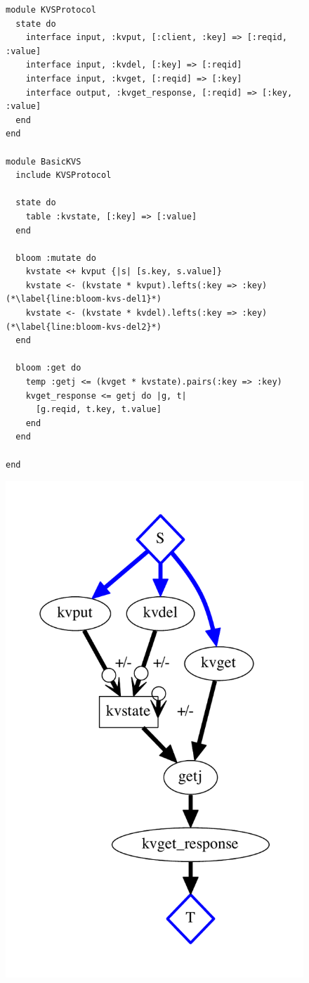 \begin{figure}[t]
\begin{minipage}{.48\textwidth}

\begin{scriptsize}
\begin{lstlisting}
module KVSProtocol
  state do
    interface input, :kvput, [:client, :key] => [:reqid, :value]
    interface input, :kvdel, [:key] => [:reqid]
    interface input, :kvget, [:reqid] => [:key]
    interface output, :kvget_response, [:reqid] => [:key, :value]
  end
end

module BasicKVS
  include KVSProtocol

  state do
    table :kvstate, [:key] => [:value]
  end

  bloom :mutate do
    kvstate <+ kvput {|s| [s.key, s.value]}
    kvstate <- (kvstate * kvput).lefts(:key => :key) (*\label{line:bloom-kvs-del1}*)
    kvstate <- (kvstate * kvdel).lefts(:key => :key) (*\label{line:bloom-kvs-del2}*)
  end

  bloom :get do
    temp :getj <= (kvget * kvstate).pairs(:key => :key)
    kvget_response <= getj do |g, t|
      [g.reqid, t.key, t.value]
    end
  end

end

\end{lstlisting}
\end{scriptsize}
\end{minipage}
\begin{minipage}{.48\textwidth}
\raggedleft
\includegraphics[width=0.7\linewidth]{kvs.pdf}
\end{minipage}


\end{figure}
